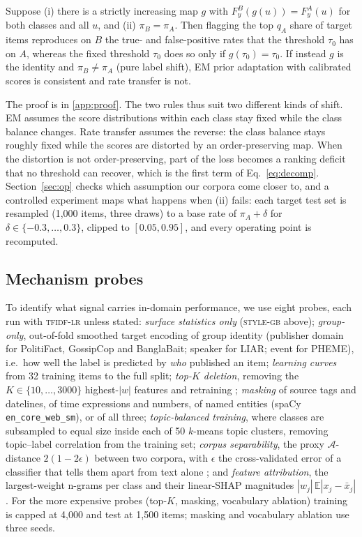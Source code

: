 \begin{proposition}\label{prop:rate}
Suppose (i) there is a strictly increasing map $g$ with $F^B_y(g(u))=F^A_y(u)$ for both classes and all $u$, and (ii) $\pi_B=\pi_A$. Then flagging the top $q_A$ share of target items reproduces on $B$ the true- and false-positive rates that the threshold $\tau_0$ has on $A$, whereas the fixed threshold $\tau_0$ does so only if $g(\tau_0)=\tau_0$. If instead $g$ is the identity and $\pi_B\neq\pi_A$ (pure label shift), EM prior adaptation with calibrated scores is consistent and rate transfer is not.
\end{proposition}

The proof is in \ref{app:proof}. The two rules thus suit two different kinds of shift. EM assumes the score distributions within each class stay fixed while the class balance changes. Rate transfer assumes the reverse: the class balance stays roughly fixed while the scores are distorted by an order-preserving map. When the distortion is not order-preserving, part of the loss becomes a ranking deficit that no threshold can recover, which is the first term of Eq.~\eqref{eq:decomp}. Section~\ref{sec:op} checks which assumption our corpora come closer to, and a controlled experiment maps what happens when (ii) fails: each target test set is resampled (1{,}000 items, three draws) to a base rate of $\pi_A+\delta$ for $\delta\in\{-0.3,\dots,0.3\}$, clipped to $[0.05,0.95]$, and every operating point is recomputed.

\subsection{Mechanism probes}\label{sec:probes}
To identify what signal carries in-domain performance, we use eight probes, each run with \textsc{tfidf-lr} unless stated:
\emph{surface statistics only} (\textsc{style-gb} above);
\emph{group-only}, out-of-fold smoothed target encoding of group identity (publisher domain for PolitiFact, GossipCop and BanglaBait; speaker for LIAR; event for PHEME), i.e.\ how well the label is predicted by \emph{who} published an item;
\emph{learning curves} from 32 training items to the full split;
\emph{top-$K$ deletion}, removing the $K\in\{10,\dots,3000\}$ highest-$|w|$ features and retraining \citep[cf.][]{verma2026audit};
\emph{masking} of source tags and datelines, of time expressions and numbers, of named entities (spaCy \texttt{en\_core\_web\_sm}), or of all three;
\emph{topic-balanced training}, where classes are subsampled to equal size inside each of 50 $k$-means topic clusters, removing topic--label correlation from the training set;
\emph{corpus separability}, the proxy $\mathcal{A}$-distance $2(1-2\epsilon)$ between two corpora, with $\epsilon$ the cross-validated error of a classifier that tells them apart from text alone \citep{bendavid2010theory};
and \emph{feature attribution}, the largest-weight n-grams per class and their linear-SHAP magnitudes $|w_j|\,\mathbb{E}|x_j-\bar x_j|$.
For the more expensive probes (top-$K$, masking, vocabulary ablation) training is capped at 4{,}000 and test at 1{,}500 items; masking and vocabulary ablation use three seeds.

